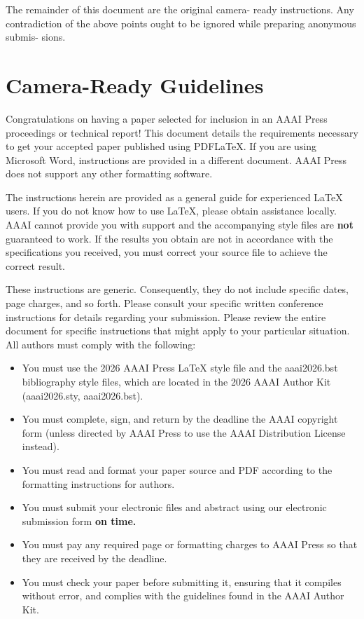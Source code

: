 \documentclass[letterpaper]{article} %
\begin{document}
The remainder of this document are the original camera-
ready instructions. Any contradiction of the above points
ought to be ignored while preparing anonymous submis-
sions.

\section{Camera-Ready Guidelines}

Congratulations on having a paper selected for inclusion in an AAAI Press proceedings or technical report! This document details the requirements necessary to get your accepted paper published using PDF\LaTeX{}. If you are using Microsoft Word, instructions are provided in a different document. AAAI Press does not support any other formatting software.

The instructions herein are provided as a general guide for experienced \LaTeX{} users. If you do not know how to use \LaTeX{}, please obtain assistance locally. AAAI cannot provide you with support and the accompanying style files are \textbf{not} guaranteed to work. If the results you obtain are not in accordance with the specifications you received, you must correct your source file to achieve the correct result.

These instructions are generic. Consequently, they do not include specific dates, page charges, and so forth. Please consult your specific written conference instructions for details regarding your submission. Please review the entire document for specific instructions that might apply to your particular situation. All authors must comply with the following:

\begin{itemize}
\item You must use the 2026 AAAI Press \LaTeX{} style file and the aaai2026.bst bibliography style files, which are located in the 2026 AAAI Author Kit (aaai2026.sty, aaai2026.bst).
\item You must complete, sign, and return by the deadline the AAAI copyright form (unless directed by AAAI Press to use the AAAI Distribution License instead).
\item You must read and format your paper source and PDF according to the formatting instructions for authors.
\item You must submit your electronic files and abstract using our electronic submission form \textbf{on time.}
\item You must pay any required page or formatting charges to AAAI Press so that they are received by the deadline.
\item You must check your paper before submitting it, ensuring that it compiles without error, and complies with the guidelines found in the AAAI Author Kit.
\end{itemize}
\end{document}
